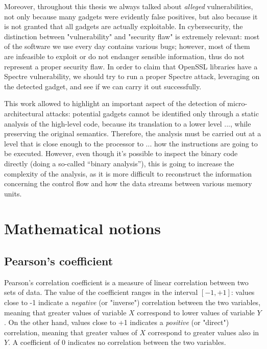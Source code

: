 \documentclass[12pt,a4paper]{book}
\theoremstyle{definition}
\begin{document}
	Moreover, throughout this thesis we always talked about \textit{alleged} vulnerabilities, not only because many gadgets were evidently false positives, but also because it is not granted that all gadgets are actually exploitable. In cybersecurity, the distinction between "vulnerability" and "security flaw" is extremely relevant: most of the software we use every day contains various bugs; however, most of them are infeasible to exploit or do not endanger sensible information, thus do not represent a proper security flaw. In order to claim that OpenSSL libraries have a Spectre vulnerability, we should try to run a proper Spectre attack, leveraging on the detected gadget, and see if we can carry it out successfully. 
	
	This work allowed to highlight an important aspect of the detection of micro-architectural attacks: potential gadgets cannot be identified only through a static analysis of the high-level code, because its translation to a lower level ..., while preserving the original semantics. Therefore, the analysis must be carried out at a level that is close enough to the processor to ... how the instructions are going to be executed. However, even though it's possible to inspect the binary code directly (doing a so-called ``binary analysis''), this is going to increase the complexity of the analysis, as it is more difficult to reconstruct the information concerning the control flow and how the data streams between various memory units.
	
	\appendix
	
	\chapter{Mathematical notions}\label{appendix:maths}
	\section{Pearson's coefficient}
	Pearson's correlation coefficient \cite{Pearson1895} is a measure of linear correlation between two sets of data. The value of the coefficient ranges in the interval $[-1,+1]$: values close to -1 indicate a \textit{negative} (or "inverse") correlation between the two variables, meaning that greater values of variable $X$ correspond to lower values of variable $Y$. On the other hand, values close to +1 indicates a \textit{positive} (or "direct") correlation, meaning that greater values of $X$ correspond to greater values also in $Y$. A coefficient of 0 indicates no correlation between the two variables.	
	
\end{document}
